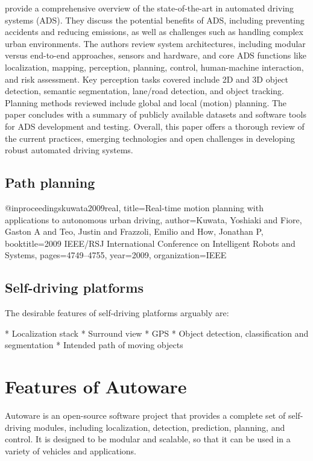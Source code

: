 \cite{Yurtsever_2020} provide a comprehensive overview of the state-of-the-art in automated driving systems (ADS). They discuss the potential benefits of ADS, including preventing accidents and reducing emissions, as well as challenges such as handling complex urban environments. The authors review system architectures, including modular versus end-to-end approaches, sensors and hardware, and core ADS functions like localization, mapping, perception, planning, control, human-machine interaction, and risk assessment. Key perception tasks covered include 2D and 3D object detection, semantic segmentation, lane/road detection, and object tracking. Planning methods reviewed include global and local (motion) planning. The paper concludes with a summary of publicly available datasets and software tools for ADS development and testing. Overall, this paper offers a thorough review of the current practices, emerging technologies and open challenges in developing robust automated driving systems.

\subsection{Path planning}

@inproceedings{kuwata2009real,
  title={Real-time motion planning with applications to autonomous urban driving},
  author={Kuwata, Yoshiaki and Fiore, Gaston A and Teo, Justin and Frazzoli, Emilio and How, Jonathan P},
  booktitle={2009 IEEE/RSJ International Conference on Intelligent Robots and Systems},
  pages={4749--4755},
  year={2009},
  organization={IEEE}
}

\subsection{Self-driving platforms}

The desirable features of self-driving platforms arguably are:

* Localization stack
* Surround view
* GPS
* Object detection, classification and segmentation
* Intended path of moving objects


\section{Features of Autoware}

Autoware is an open-source software project that provides a complete set of self-driving modules, including localization, detection, prediction, planning, and control. It is designed to be modular and scalable, so that it can be used in a variety of vehicles and applications.

